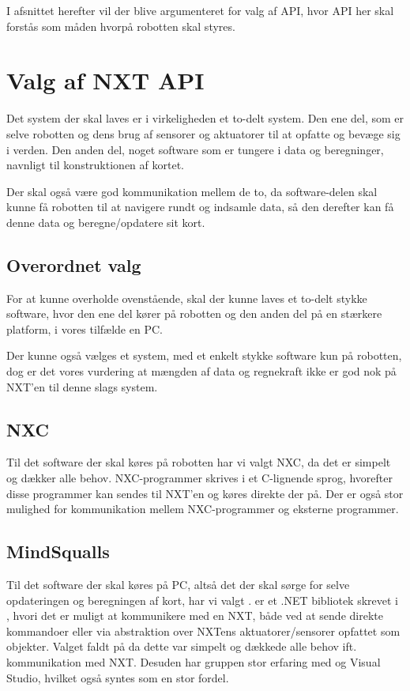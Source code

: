 I afsnittet herefter vil der blive argumenteret for valg af API, hvor API her skal forstås som måden hvorpå robotten skal styres.

\section{Valg af NXT API}\label{nxt_api}
Det system der skal laves er i virkeligheden et to-delt system.
Den ene del, som er selve robotten og dens brug af sensorer og aktuatorer til at opfatte og bevæge sig i verden.
Den anden del, noget software som er tungere i data og beregninger, navnligt til konstruktionen af kortet.

Der skal også være god kommunikation mellem de to, da software-delen skal kunne få robotten til at navigere rundt og indsamle data, så den derefter kan få denne data og beregne/opdatere sit kort.

\subsection{Overordnet valg}
For at kunne overholde ovenstående, skal der kunne laves et to-delt stykke software, hvor den ene del kører på robotten og den anden del på en stærkere platform, i vores tilfælde en PC.

Der kunne også vælges et system, med et enkelt stykke software kun på robotten, dog er det vores vurdering at mængden af data og regnekraft ikke er god nok på NXT'en til denne slags system.

\subsection{NXC}
Til det software der skal køres på robotten har vi valgt NXC, da det er simpelt og dækker alle behov.
NXC-programmer skrives i et C-lignende sprog, hvorefter disse programmer kan sendes til NXT'en og køres direkte der på.
Der er også stor mulighed for kommunikation mellem NXC-programmer og eksterne programmer.

\subsection{MindSqualls}
Til det software der skal køres på PC, altså det der skal sørge for selve opdateringen og beregningen af kort, har vi valgt \mindsqualls.
\mindsqualls er et .NET bibliotek skrevet i \csharp, hvori det er muligt at kommunikere med en NXT, både ved at sende direkte kommandoer eller via abstraktion over NXTens aktuatorer/sensorer opfattet som objekter.
Valget faldt på \mindsqualls da dette var simpelt og dækkede alle behov ift. kommunikation med NXT.
Desuden har gruppen stor erfaring med \csharp og Visual Studio, hvilket også syntes som en stor fordel.